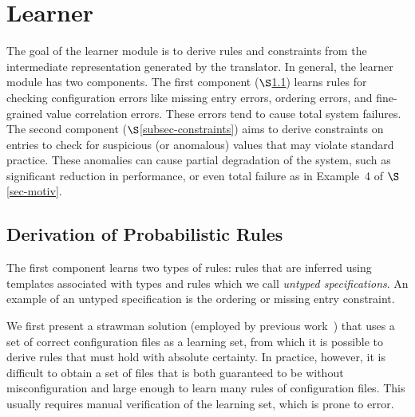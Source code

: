 \section{Learner}
\label{sec-learn}


The goal of the learner module is to derive rules and constraints from
the intermediate representation generated by the translator.
In general, the learner module has two components.
The first component ($\S$\ref{subsec-rules}) 
learns rules for checking configuration errors like
missing entry errors, ordering errors, and fine-grained value correlation errors. 
These errors tend to cause total system failures.
The second component ($\S$\ref{subsec-constraints}) 
aims to derive 
constraints on entries to check for suspicious (or anomalous) values 
that may violate standard practice. These anomalies can cause partial 
degradation of the system, 
such as significant reduction in performance, or even 
total failure as in Example~4 of $\S$\ref{sec-motiv}.

\subsection{Derivation of Probabilistic Rules}
\label{subsec-rules}

The first component learns two types of rules: rules that are inferred using templates associated with types 
and rules which we call \emph{untyped specifications}. An example of an
untyped specification is the ordering or missing entry constraint.

We first present a strawman solution (employed by
previous work~\cite{santolucitoCAV}) that uses 
a set of correct configuration files as a learning set, 
from which it is possible to derive rules 
that must hold with absolute certainty. 
In practice, however, it is difficult to obtain a set of files 
that is both guaranteed to be without misconfiguration 
and large enough to learn many rules of configuration files.
This usually requires manual verification of the learning set, 
which is prone to error.

